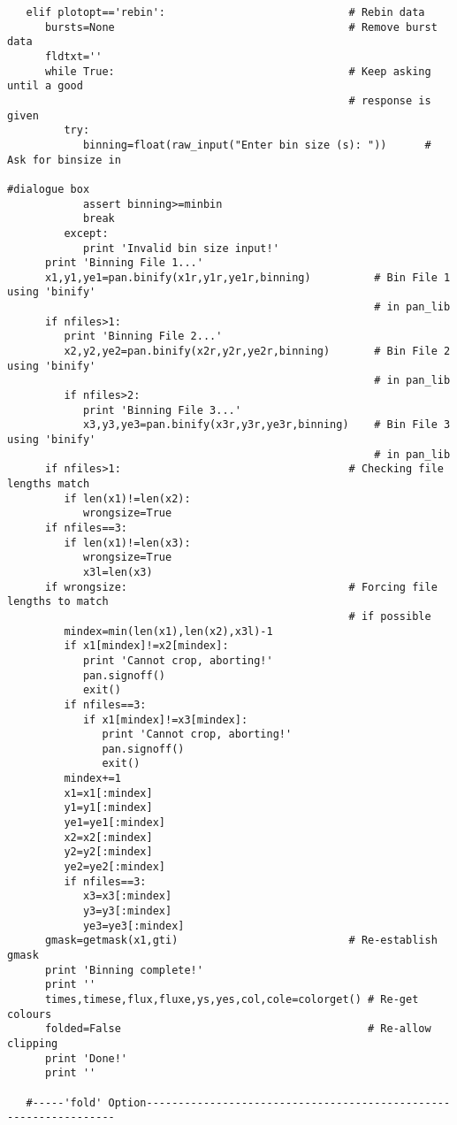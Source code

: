 \begin{verbatim}
   elif plotopt=='rebin':                             # Rebin data
      bursts=None                                     # Remove burst data
      fldtxt=''
      while True:                                     # Keep asking until a good
                                                      # response is given
         try:
            binning=float(raw_input("Enter bin size (s): "))      # Ask for binsize in
                                                                  #dialogue box
            assert binning>=minbin
            break
         except:
            print 'Invalid bin size input!'
      print 'Binning File 1...'
      x1,y1,ye1=pan.binify(x1r,y1r,ye1r,binning)          # Bin File 1 using 'binify'
                                                          # in pan_lib
      if nfiles>1:
         print 'Binning File 2...'
         x2,y2,ye2=pan.binify(x2r,y2r,ye2r,binning)       # Bin File 2 using 'binify'
                                                          # in pan_lib
         if nfiles>2:
            print 'Binning File 3...'
            x3,y3,ye3=pan.binify(x3r,y3r,ye3r,binning)    # Bin File 3 using 'binify'
                                                          # in pan_lib
      if nfiles>1:                                    # Checking file lengths match
         if len(x1)!=len(x2):
            wrongsize=True
      if nfiles==3:
         if len(x1)!=len(x3):
            wrongsize=True
            x3l=len(x3)
      if wrongsize:                                   # Forcing file lengths to match
                                                      # if possible
         mindex=min(len(x1),len(x2),x3l)-1
         if x1[mindex]!=x2[mindex]:
            print 'Cannot crop, aborting!'
            pan.signoff()
            exit()
         if nfiles==3:
            if x1[mindex]!=x3[mindex]:
               print 'Cannot crop, aborting!'
               pan.signoff()
               exit()
         mindex+=1
         x1=x1[:mindex]
         y1=y1[:mindex]
         ye1=ye1[:mindex]
         x2=x2[:mindex]
         y2=y2[:mindex]
         ye2=ye2[:mindex]
         if nfiles==3:
            x3=x3[:mindex]
            y3=y3[:mindex]
            ye3=ye3[:mindex]
      gmask=getmask(x1,gti)                           # Re-establish gmask
      print 'Binning complete!'
      print ''
      times,timese,flux,fluxe,ys,yes,col,cole=colorget() # Re-get colours
      folded=False                                       # Re-allow clipping
      print 'Done!'
      print ''

   #-----'fold' Option-----------------------------------------------------------------


\end{verbatim}
